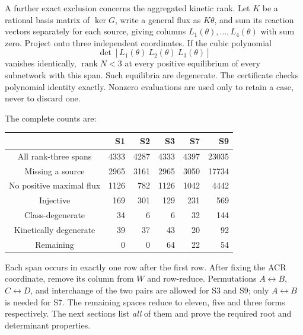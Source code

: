 \documentclass[11pt,a4paper]{report}
\providecommand{\rank}{\operatorname{rank}}
\begin{document}
A further exact exclusion concerns the aggregated kinetic rank. Let $K$ be a rational basis matrix
of $\ker G$, write a general flux as $K\theta$, and sum its reaction vectors separately for each
source, giving columns $L_1(\theta),\ldots,L_4(\theta)$ with sum zero. Project onto three independent
coordinates. If the cubic polynomial
\[
 \det[L_1(\theta)\ L_2(\theta)\ L_3(\theta)]
\]
vanishes identically, $\rank N<3$ at every positive equilibrium of every subnetwork with this span.
Such equilibria are degenerate. The certificate checks polynomial identity exactly. Nonzero evaluations
are used only to retain a case, never to discard one.

The complete counts are:
\begin{center}\small
\begin{tabular}{crrrrr}
\toprule
 & S1 & S2 & S3 & S7 & S9\\
\midrule
All rank-three spans & 4333&4287&4333&4397&23035\\
Missing a source &2965&3161&2965&3050&17734\\
No positive maximal flux &1126&782&1126&1042&4442\\
Injective &169&301&129&231&569\\
Class-degenerate &34&6&6&32&144\\
Kinetically degenerate &39&37&43&20&92\\
Remaining &0&0&64&22&54\\
\bottomrule
\end{tabular}
\end{center}
Each span occurs in exactly one row after the first row. After fixing the ACR coordinate, remove its
column from $W$ and row-reduce. Permutations $A\leftrightarrow B$, $C\leftrightarrow D$, and interchange
of the two pairs are allowed for S3 and S9; only $A\leftrightarrow B$ is needed for S7. The remaining
spaces reduce to eleven, five and three forms respectively. The next sections list \emph{all} of them
and prove the required root and determinant properties.
\end{document}
